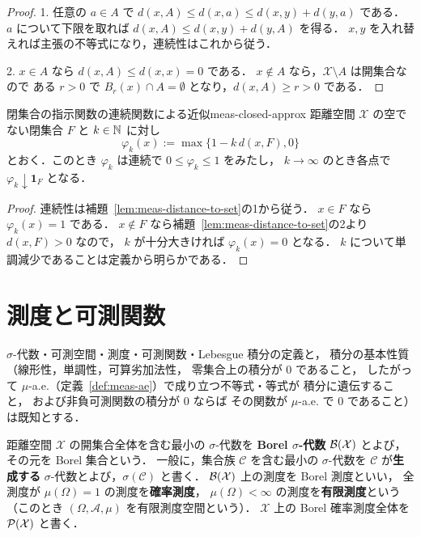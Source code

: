 \begin{proof}
  1. 任意の $a\in A$ で $d(x,A)\leq d(x,a)\leq d(x,y)+d(y,a)$ である．
  $a$ について下限を取れば $d(x,A)\leq d(x,y)+d(y,A)$ を得る．
  $x,y$ を入れ替えれば主張の不等式になり，連続性はこれから従う．

  2. $x\in A$ なら $d(x,A)\leq d(x,x)=0$ である．
  $x\notin A$ なら，$\mathcal{X}\setminus A$ は開集合なので
  ある $r>0$ で $B_r(x)\cap A=\emptyset$ となり，$d(x,A)\geq r>0$ である．
\end{proof}

\begin{lemma}{閉集合の指示関数の連続関数による近似}{meas-closed-approx}
  距離空間 $\mathcal{X}$ の空でない閉集合 $F$ と $k\in\mathbb{N}$ に対し
  \[
    \varphi_k(x):=\max\{1-k\,d(x,F),0\}
  \]
  とおく．このとき $\varphi_k$ は連続で $0\leq\varphi_k\leq1$ をみたし，
  $k\to\infty$ のとき各点で $\varphi_k\downarrow\mathbf{1}_F$ となる．
\end{lemma}

\begin{proof}
  連続性は補題~\ref{lem:meas-distance-to-set}の1から従う．
  $x\in F$ なら $\varphi_k(x)=1$ である．
  $x\notin F$ なら補題~\ref{lem:meas-distance-to-set}の2より $d(x,F)>0$ なので，
  $k$ が十分大きければ $\varphi_k(x)=0$ となる．
  $k$ について単調減少であることは定義から明らかである．
\end{proof}

\section{測度と可測関数}

$\sigma$-代数・可測空間・測度・可測関数・Lebesgue 積分の定義と，
積分の基本性質（線形性，単調性，可算劣加法性，
零集合上の積分が $0$ であること，
したがって $\mu$-a.e.（定義~\ref{def:meas-ae}）で成り立つ不等式・等式が
積分に遺伝すること，
および非負可測関数の積分が $0$ ならば
その関数が $\mu$-a.e. で $0$ であること）は既知とする．

距離空間 $\mathcal{X}$ の開集合全体を含む最小の $\sigma$-代数を
\textbf{Borel $\sigma$-代数} $\mathcal{B}(\mathcal{X})$ とよび，その元を Borel 集合という．
一般に，集合族 $\mathcal{C}$ を含む最小の $\sigma$-代数を
$\mathcal{C}$ が\textbf{生成する} $\sigma$-代数とよび，$\sigma(\mathcal{C})$ と書く．
$\mathcal{B}(\mathcal{X})$ 上の測度を Borel 測度といい，
全測度が $\mu(\Omega)=1$ の測度を\textbf{確率測度}，
$\mu(\Omega)<\infty$ の測度を\textbf{有限測度}という
（このとき $(\Omega,\mathcal{A},\mu)$ を有限測度空間という）．
$\mathcal{X}$ 上の Borel 確率測度全体を $\mathcal{P}(\mathcal{X})$ と書く．

